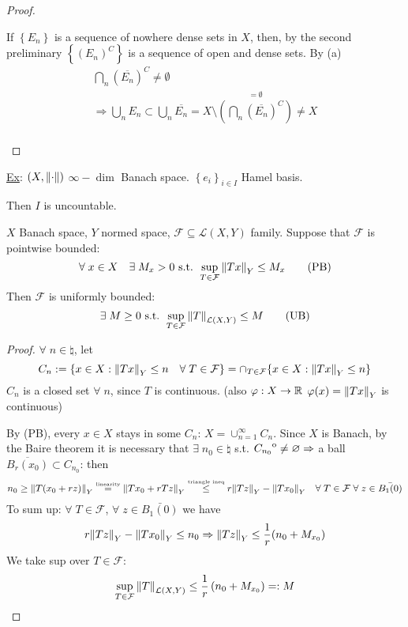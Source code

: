 \begin{proof}
\begin{itemize}
        If \(\left\{ E_n \right\}\) is a sequence of nowhere dense sets in \(X\), then, by the second preliminary \(\left\{ (E_n)^C \right\}\) is a sequence of open and dense sets. By (a) 
        \[
            \begin{array}{l}
                \bigcap_n (\overline{E_n})^C \neq \emptyset \\
                \Rightarrow \bigcup_n E_n \subset \bigcup_n \overline{E_n} = X \setminus \overset{= \emptyset}{\left(\bigcap_n (\overline{E_n})^C\right)} \neq X \\

            \end{array} 
        \]
    \end{itemize}
\end{proof}
\noindent\underline{Ex}: \((X, \norm{\cdot})\) \(\infty-\dim\) Banach space. \(\left\{ e_i \right\}_{i \in I}\) Hamel basis. 

Then \(I\) is uncountable.
\begin{theorem}
    \(X\) Banach space, \(Y\) normed space, \(\mathcal{F} \subseteq \mathcal{L}(X, Y)\) family.
    Suppose that \(\mathcal{F}\) is pointwise bounded: 
    \[
        \forall\; x \in X \quad \exists \; M_x >0 \text{ s.t. } \sup_{T \in \mathcal{F}} \norm{Tx}_Y \leq M_x \tag*{(PB)}
    \]
    Then \(\mathcal{F} \) is uniformly bounded: 
    \[
        \exists \; M \geq 0 \text{ s.t. } \sup_{T \in \mathcal{F}} \norm{T}_{\mathcal{L}(X, Y)} \leq M \tag*{(UB)}
    \]
\end{theorem}
\begin{proof}
    \(\forall \; n \in \natural\), let 
    \[
        C_n := \{ x \in X: \norm{Tx}_Y \leq n \quad \forall \; T \in \mathcal{F} \} 
        = \cap_{T \in \mathcal{F}} \{ x \in X: \norm{Tx}_Y \leq n \}
    \]
    \(C_n\) is a closed set \(\forall \; n\), since \(T\) is continuous. (also \(\varphi: X \to \mathbb{R} \) \(\varphi(x)=\norm{Tx}_Y\) is continuous)

    By (PB), every \(x \in X\) stays in some \(C_n\): \(X = \cup_{n=1}^\infty C_n\). 
    Since \(X\) is Banach, by the Baire theorem it is necessary that \(\exists \; n_0 \in \natural\) s.t. \({\kern0ptC_{n_0}}^{\mathrm{o}} \neq \varnothing \Rightarrow\) a ball \(\overline{B_r(x_0)} \subset C_{n_0}\): then
    \[
        n_0 \geq \norm{T(x_0 + rz)}_Y \overset{\text{\tiny{linearity}}}{=} \norm{Tx_0 + rTz}_Y \overset{\text{\tiny{triangle ineq}}}{\leq} r\norm{Tz}_Y - \norm{Tx_0}_Y \quad \forall \; T \in \mathcal{F} \; \forall \; z \in \bar{B_1(0)}
    \]
    To sum up: \(\forall \; T \in \mathcal{F} \), \(\forall \; z \in \bar{B_1(0)}\) we have 
    \[
        r \norm{Tz}_Y - \norm{Tx_0}_Y \leq n_0 \Rightarrow \norm{Tz}_Y \leq \frac{1}{r}(n_0 + M_{x_0})
    \]
    We take sup over \(T \in \mathcal{F}\):
    \[
        \sup_{T \in \mathcal{F}} \norm{T}_{\mathcal{L}(X, Y)} \leq \frac{1}{r} \left(n_0 + M_{x_0}\right) =: M
    \]
\end{proof}

